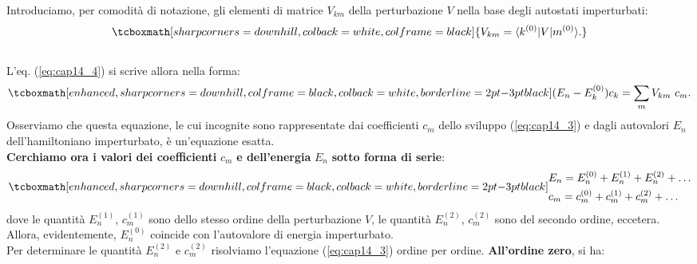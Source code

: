 Introduciamo, per comodità di notazione, gli elementi di matrice $V_{km}$ della perturbazione $V$ nella base degli autostati imperturbati:
	\begin{equation}
		\tcboxmath[sharp corners=downhill, colback=white, colframe=black]{
			V_{km} = \langle k^{(0)}\vert V\vert m^{(0)}\rangle.
			}
	\end{equation}\\
	
L'eq. (\ref{eq:cap14_4}) si scrive allora nella forma:
	\begin{equation}
		\tcboxmath[enhanced, sharp corners=downhill, colframe=black, colback=white, borderline={2pt}{-3pt}{black}]{
		(E_n - E_k ^{(0)}) c_k = \sum _m V_{km}\ c_m .
		}
	\label{eq:cap14_5}
	\end{equation}
Osserviamo che questa equazione, le cui incognite sono rappresentate dai coefficienti $c_m$ dello sviluppo (\ref{eq:cap14_3}) e dagli autovalori $E_n$ dell'hamiltoniano imperturbato, è un'equazione esatta.\\

\textbf{Cerchiamo ora i valori dei coefficienti} $c_m$ \textbf{e dell'energia} $E_n$ \textbf{sotto forma di serie}:
	\begin{equation}
		\tcboxmath[enhanced, sharp corners=downhill, colframe=black, colback=white, borderline={2pt}{-3pt}{black}]{
		\begin{aligned}
			& E_n = E_n ^{(0)}+E_n ^{(1)}+E_n ^{(2)}+\dots  \\
			& c_m = c_m ^{(0)}+c_m ^{(1)}+c_m ^{(2)}+\dots
		\end{aligned}
		}
	\end{equation}
dove le quantità $E_n ^{(1)}$, $c_m ^{(1)}$ sono dello stesso ordine della perturbazione $V$, le quantità $E_n ^{(2)}$, $c_m ^{(2)}$ sono del secondo ordine, eccetera. Allora, evidentemente, $E_n ^{(0)}$ coincide con l'autovalore di energia imperturbato.\\

Per determinare le quantità $E_n ^{(2)}$ e $c_m ^{(2)}$ risolviamo l'equazione (\ref{eq:cap14_3}) ordine per ordine. \textbf{All'ordine zero}, si ha:\\

